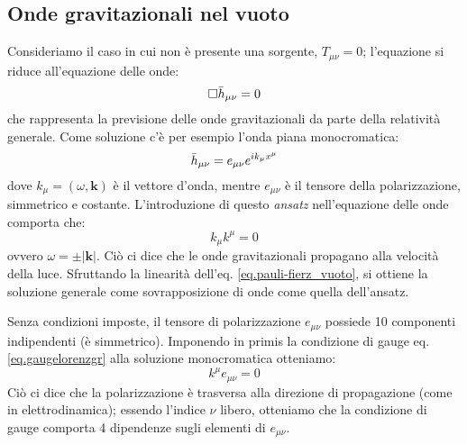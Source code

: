 \subsection{Onde gravitazionali nel vuoto}\label{para.vacuum_gw}
Consideriamo il caso in cui non è presente una sorgente, $T_{\mu\nu} = 0$; l'equazione si riduce all'equazione delle onde:
\begin{equation}
    \square \Bar{h}_{\mu\nu} = 0
    \label{eq.pauli-fierz_vuoto}
\end{equation}
che rappresenta la previsione delle onde gravitazionali da parte della relatività generale. Come soluzione c'è per esempio l'onda piana monocromatica:
\begin{equation*}
    \Bar{h}_{\mu\nu} = e_{\mu\nu} e^{ik_\mu x^\mu}
\end{equation*}
dove $k_\mu = (\omega,\bm{k})$ è il vettore d'onda, mentre $e_{\mu\nu}$ è il tensore della polarizzazione, simmetrico e costante.
L'introduzione di questo \emph{ansatz} nell'equazione delle onde comporta che:
\begin{equation*}
    k_\mu k^\mu = 0
\end{equation*}
ovvero $\omega = \pm | \bm{k} |$. Ciò ci dice che le onde gravitazionali propagano alla velocità della luce. Sfruttando la linearità dell'eq. \ref{eq.pauli-fierz_vuoto}, si ottiene la soluzione generale come sovrapposizione di onde come quella dell'ansatz.

Senza condizioni imposte, il tensore di polarizzazione $e_{\mu\nu}$ possiede 10 componenti indipendenti (è simmetrico). Imponendo in primis la condizione di gauge eq. \ref{eq.gaugelorenzgr} alla soluzione monocromatica otteniamo:
\begin{equation*}
    k^\mu e_{\mu\nu} = 0 
\end{equation*}
Ciò ci dice che la polarizzazione è trasversa alla direzione di propagazione (come in elettrodinamica); essendo l'indice $\nu$ libero, otteniamo che la condizione di gauge comporta 4 dipendenze sugli elementi di $e_{\mu\nu}$.

